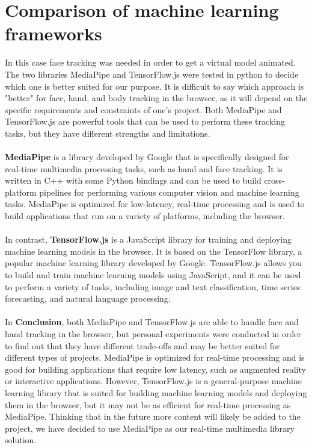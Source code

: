 \section{Comparison of machine learning frameworks}
In this case face tracking was needed in order to get a virtual model animated. 
The two libraries MediaPipe and TensorFlow.js were tested in python to decide 
which one is better suited for our purpose. It is difficult to say which approach 
is "better" for face, hand, and body tracking in the browser, as it will depend 
on the specific requirements and constraints of one's project. Both MediaPipe and 
TensorFlow.js are powerful tools that can be used to perform these tracking tasks, 
but they have different strengths and limitations.
\\
\\
\textbf{MediaPipe} is a library developed by Google that is specifically designed 
for real-time multimedia processing tasks, such as hand and face tracking. 
It is written in C++ with some Python bindings and can be used to build cross-platform 
pipelines for performing various computer vision and machine learning tasks. MediaPipe is 
optimized for low-latency, real-time processing and is used to build applications that run 
on a variety of platforms, including the browser.
\\
\\
In contrast, \textbf{TensorFlow.js} is a JavaScript library for training and deploying machine 
learning models in the browser. It is based on the TensorFlow library, a popular machine 
learning library developed by Google. TensorFlow.js allows you to build and train machine 
learning models using JavaScript, and it can be used to perform a variety of tasks, including 
image and text classification, time series forecasting, and natural language processing.
\\
\\
In \textbf{Conclusion}, both MediaPipe and TensorFlow.js are able to handle face and hand
tracking in the browser, but personal experiments were conducted in order to find out 
that they have different trade-offs and may be better suited
for different types of projects. MediaPipe is optimized for real-time processing and is
good for building applications that require low latency, such as augmented reality or
interactive applications. However, TensorFlow.js is a general-purpose machine learning
library that is suited for building machine learning models and deploying them in the
browser, but it may not be as efficient for real-time processing as MediaPipe. Thinking
that in the future more content will likely be added to the project, we have decided to
use MediaPipe as our real-time multimedia library solution.


